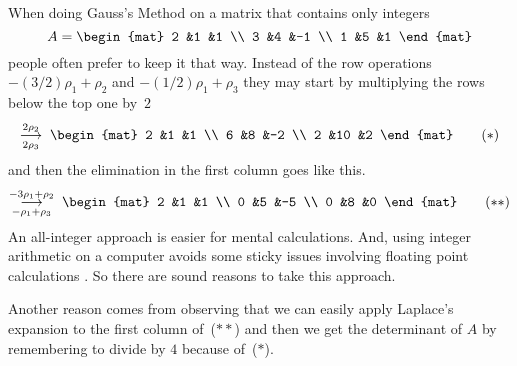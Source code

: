 
When doing Gauss's Method on a matrix that contains only integers
\begin{equation*}
  A=
  \begin{mat}
    2 &1 &1 \\
    3 &4 &-1 \\
    1 &5 &1 
  \end{mat}
\end{equation*}
people often prefer to keep it that way.
Instead of the row operations $-(3/2)\rho_1+\rho_2$ and
$-(1/2)\rho_1+\rho_3$ they may start by multiplying the rows below the top one
by~$2$
\begin{equation*}
  \grstep[2\rho_3]{2\rho_2}\;
  \begin{mat}
    2 &1 &1 \\
    6 &8 &-2 \\
    2 &10 &2 
  \end{mat}
  \tag{$*$}
\end{equation*}
and then the elimination in the first column goes like this.
\begin{equation*}
  \grstep[-\rho_1+\rho_3]{-3\rho_1+\rho_2}\;
  \begin{mat}
    2 &1 &1 \\
    0 &5 &-5 \\
    0 &8 &0 
  \end{mat}
  \tag{$**$}
\end{equation*}
An all-integer approach is easier for mental calculations. 
And, using integer arithmetic on a computer
avoids some sticky issues involving floating point calculations \cite{Kahan}.
So there are sound reasons to take this approach.

Another reason comes from
observing that we can easily apply Laplace's expansion to the 
first column of~($**$) and then we get the determinant of $A$ by 
remembering to divide by $4$ because of~($*$).

